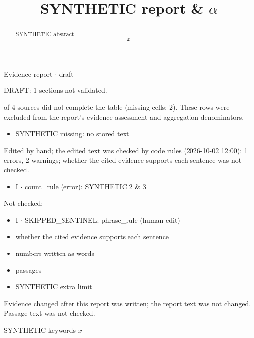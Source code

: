 \documentclass[journal]{IEEEtran}
\begin{document}
\title{SYNTHETIC report \& \ensuremath{\alpha}}

\maketitle

\noindent Evidence report \ensuremath{\cdot} draft

\noindent DRAFT: 1 sections not validated.

 of 4 sources did not complete the table (missing cells: 2). These rows were excluded from the report's evidence assessment and aggregation denominators.

\begin{itemize}
\item SYNTHETIC missing: no stored text
\end{itemize}

\noindent Edited by hand; the edited text was checked by code rules (2026-10-02 12:00): 1 errors, 2 warnings; whether the cited evidence supports each sentence was not checked.

\begin{itemize}
\item I \ensuremath{\cdot} count\_rule (error): SYNTHETIC 2 \& 3
\end{itemize}

\noindent Not checked:

\begin{itemize}
\item I \ensuremath{\cdot} SKIPPED\_SENTINEL: phrase\_rule (human edit)
\item whether the cited evidence supports each sentence
\item numbers written as words
\item passages
\item SYNTHETIC extra limit
\end{itemize}

\noindent Evidence changed after this report was written; the report text was not changed. Passage text was not checked.

\begin{abstract}

SYNTHETIC abstract
\begin{equation}
\label{eq:EQ1}
x
\end{equation}
\cite{Synth26}

\end{abstract}

\begin{IEEEkeywords}

SYNTHETIC keywords $x$

\end{IEEEkeywords}
\end{document}
